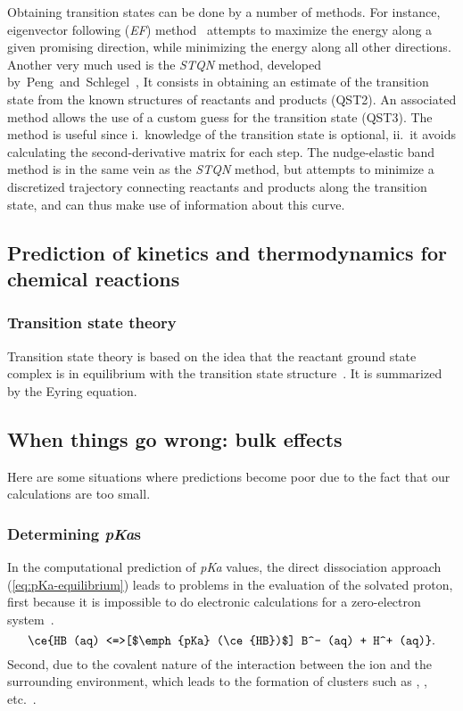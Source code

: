Obtaining transition states can be done by a number of methods.
For instance, eigenvector following (\emph{EF})
method~\cite{Banerjee_1985,Schlegel_1987,Mauro_2005}
attempts to maximize the energy along a given promising direction, while
minimizing the energy along all other directions.
Another very much used is the \emph{STQN} method, developed
by~Peng~and~Schlegel~\cite{Peng_1993,Peng_1996},
It consists in obtaining an estimate of the transition state from the known
structures of reactants and products (QST2).
An associated method allows the use of a custom guess for the transition state
(QST3).
The method is useful since
i.\ knowledge of the transition state is optional,
ii.\ it avoids calculating the second-derivative matrix for each step.
The nudge-elastic band method is in the same vein as the \emph{STQN} method,
but attempts to minimize a discretized trajectory connecting reactants and
products along the transition state, and can thus make use of information about
this curve.

\subsection{Prediction of kinetics and thermodynamics for chemical reactions}

\subsubsection{Transition state theory}\label{sec:tst}

Transition state theory
is based on the idea that the reactant ground state complex is in equilibrium
with the transition state structure~\cite{TransitionStateTheory}.
It is summarized by the Eyring equation.

\subsection{When things go wrong: bulk effects}

Here are some situations where predictions become poor due to the fact that our
calculations are too small.

\subsubsection{Determining \emph{pKa}s}\label{sec:pka}

In the computational prediction of \emph{pKa} values,
the direct dissociation approach (\cref{eq:pKa-equilibrium})
leads to problems in the evaluation of the solvated proton,
first because it is impossible to do electronic calculations for a zero-electron
system~\cite{Ding_2009,Sumon_2012}.
%
\begin{equation}
  \ce{HB (aq) <=>[$\emph{pKa} (\ce{HB})$] B^- (aq) + H^+ (aq)}\text{.}
  \label{eq:pKa-equilibrium}
\end{equation}
%
Second, due to the covalent nature of the interaction between the  ion
and the surrounding environment, which leads to the formation of clusters such
as , , etc.~\cite{Sumon_2012}.

